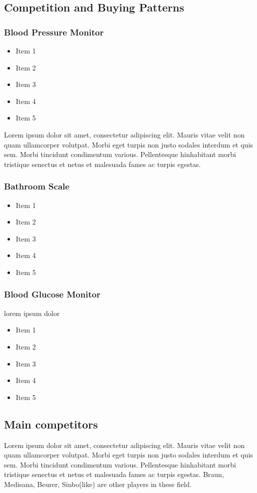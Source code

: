 \documentclass[11pt]{article}
\begin{document}
\subsection{Competition and Buying Patterns}

\subsubsection{Blood Pressure Monitor}
\begin{itemize}
\item Item 1
\item Item 2
\item Item 3
\item Item 4
\item Item 5
\end{itemize}
Lorem ipsum dolor sit amet, consectetur adipiscing elit. Mauris vitae velit
non quam ullamcorper volutpat. Morbi eget turpis non justo sodales interdum
et quis sem. Morbi tincidunt condimentum various. Pellentesque hinhabitant morbi
tristique senectus et netus et malesuada fames ac turpis egestas.\newline
\subsubsection{Bathroom Scale}
\begin{itemize}
\item Item 1
\item Item 2
\item Item 3
\item Item 4
\item Item 5
\end{itemize}
\subsubsection{Blood Glucose Monitor}
lorem ipsum dolor
\begin{itemize}
\item Item 1
\item Item 2
\item Item 3
\item Item 4
\item Item 5
\end{itemize}
\subsection{Main competitors}
Lorem ipsum dolor sit amet, consectetur adipiscing elit. Mauris vitae velit
non quam ullamcorper volutpat. Morbi eget turpis non justo sodales interdum
et quis sem. Morbi tincidunt condimentum various. Pellentesque hinhabitant morbi
tristique senectus et netus et malesuada fames ac turpis egestas.\newline
Braun, Medisana, Beurer, Sinbo(like) are other players in these field.
\end{document}
